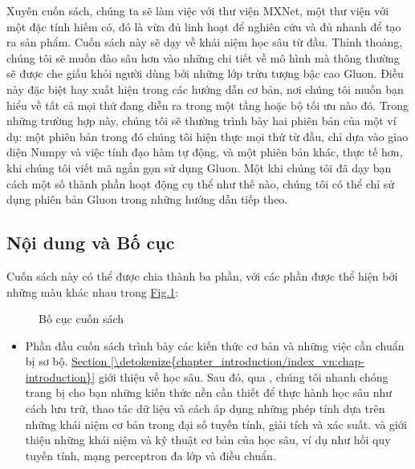 \documentclass[letterpaper,11pt,english]{sphinxmanual}
\begin{document}
Xuyên cuốn sách, chúng ta sẽ làm việc với thư viện MXNet, một thư viện
với một đặc tính hiếm có, đó là vừa đủ linh hoạt để nghiên cứu và đủ
nhanh để tạo ra sản phẩm. Cuốn sách này sẽ dạy về khái niệm học sâu từ
đầu. Thỉnh thoảng, chúng tôi sẽ muốn đào sâu hơn vào những chi tiết về
mô hình mà thông thường sẽ được che giấu khỏi người dùng bởi những lớp
trừu tượng bậc cao Gluon. Điều này đặc biệt hay xuất hiện trong các
hướng dẫn cơ bản, nơi chúng tôi muốn bạn hiểu về tất cả mọi thứ đang
diễn ra trong một tầng hoặc bộ tối ưu nào đó. Trong những trường hợp
này, chúng tôi sẽ thường trình bày hai phiên bản của một ví dụ: một
phiên bản trong đó chúng tôi hiện thực mọi thứ từ đầu, chỉ dựa vào giao
diện Numpy và việc tính đạo hàm tự động, và một phiên bản khác, thực tế
hơn, khi chúng tôi viết mã ngắn gọn sử dụng Gluon. Một khi chúng tôi đã
dạy bạn cách một số thành phần hoạt động cụ thể như thế nào, chúng tôi
có thể chỉ sử dụng phiên bản Gluon trong những hướng dẫn tiếp theo.








\subsection{Nội dung và Bố cục}
\label{\detokenize{chapter_preface/index_vn:noi-dung-va-bo-cuc}}


Cuốn sách này có thể được chia thành ba phần, với các phần được thể hiện
bởi những màu khác nhau trong \hyperref[\detokenize{chapter_preface/index_vn:fig-book-org}]{Fig.\@ \ref{\detokenize{chapter_preface/index_vn:fig-book-org}}}:



\begin{figure}[H]
\centering
\capstart

\noindent{}
\caption{Bố cục cuốn sách}\label{\detokenize{chapter_preface/index_vn:id5}}\label{\detokenize{chapter_preface/index_vn:fig-book-org}}\end{figure}


\begin{itemize}
\item {} 
Phần đầu cuốn sách trình bày các kiến thức cơ bản và những việc cần
chuẩn bị sơ bộ. \hyperref[\detokenize{chapter_introduction/index_vn:chap-introduction}]{Section \ref{\detokenize{chapter_introduction/index_vn:chap-introduction}}} giới thiệu về học sâu.
Sau đó, qua , chúng tôi nhanh chóng
trang bị cho bạn những kiến thức nền cần thiết để thực hành học sâu
như cách lưu trữ, thao tác dữ liệu và cách áp dụng những phép tính
dựa trên những khái niệm cơ bản trong đại số tuyến tính, giải tích và
xác suất.  và 
giới thiệu những khái niệm và kỹ thuật cơ bản của học sâu, ví dụ như
hồi quy tuyến tính, mạng perceptron đa lớp và điều chuẩn.

\end{itemize}
\end{document}
